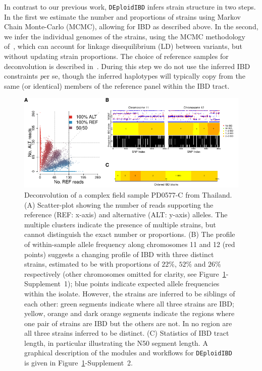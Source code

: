 \documentclass[9pt,lineno]{elife}
\begin{document}
In contrast to our previous work, \texttt{DEploidIBD} infers strain structure in two steps.  In the first we estimate the number and proportions of strains using Markov Chain Monte-Carlo (MCMC), allowing for IBD as described above.  In the second, we infer the individual genomes of the strains, using the MCMC methodology of~\citet{Zhu2017}, which can account for linkage disequilibrium (LD) between variants, but without updating strain proportions.  The choice of reference samples for deconvolution is described in~\citet{Zhu2017}.  During this step we do not use the inferred IBD constraints {\emph per se}, though the inferred haplotypes will typically copy from the same (or identical) members of the reference panel within the IBD tract.


\begin{figure}[ht]
  \begin{center}
    \includegraphics[width=\textwidth]{Fig1.pdf}
    \caption{Deconvolution of a complex field sample PD0577-C from Thailand.  (A) Scatter-plot showing the number of reads supporting the reference (REF: x-axis) and alternative (ALT: y-axis) alleles. The multiple clusters indicate the presence of multiple strains, but cannot distinguish the exact number or proportions.  (B) The profile of within-sample allele frequency along chromosomes 11 and 12 (red points) suggests a changing profile of IBD with three distinct strains, estimated to be with proportions of $22\%$, $52\%$ and $26\%$ respectively (other chromosomes omitted for clarity, see Figure~\ref{fig:fig1}-Supplement~1); blue points indicate expected allele frequencies within the isolate. However, the strains are inferred to be siblings of each other: green segments indicate where all three strains are IBD; yellow, orange and dark orange segments indicate the regions where one pair of strains are IBD but the others are not.  In no region are all three strains inferred to be distinct. (C) Statistics of  IBD tract length, in particular illustrating the N50 segment length. A graphical description of the modules and workflows for \texttt{DEploidIBD} is given in Figure~\ref{fig:fig1}-Supplement~2.}\label{fig:fig1}
  \end{center}


\end{figure}
\end{document}
